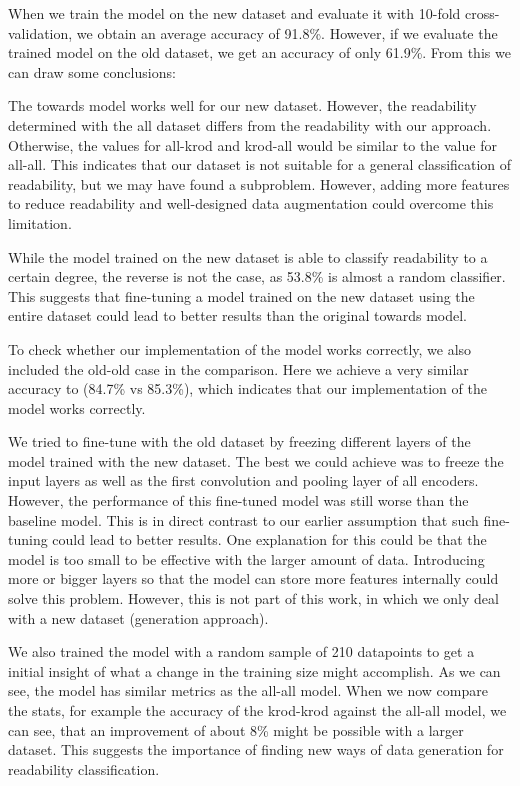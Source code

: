 \documentclass[%
class=scrreprt,
chapterprefix=false,%
open=right,%
twoside=false,%
paper=a4,%
logofile={Logo\_zentral\_farbig\_EN.png},%
thesistype=master,%
UKenglish,%
]{se2thesis}
\theoremstyle{definition}
\begin{document}
	When we train the model on the new dataset and evaluate it with 10-fold cross-validation, we obtain an average accuracy of 91.8\%. However, if we evaluate the trained model on the old dataset, we get an accuracy of only 61.9\%. From this we can draw some conclusions:
	
	The towards model works well for our new dataset. However, the readability determined with the all dataset differs from the readability with our approach. Otherwise, the values for all-krod and krod-all would be similar to the value for all-all. This indicates that our dataset is not suitable for a general classification of readability, but we may have found a subproblem. However, adding more features to reduce readability and well-designed data augmentation could overcome this limitation.
		
	While the model trained on the new dataset is able to classify readability to a certain degree, the reverse is not the case, as 53.8\% is almost a random classifier. This suggests that fine-tuning a model trained on the new dataset using the entire dataset could lead to better results than the original towards model.
	
	To check whether our implementation of the model works correctly, we also included the old-old case in the comparison. Here we achieve a very similar accuracy to \citeauthor{mi2022towards} (84.7\% vs 85.3\%), which indicates that our implementation of the model works correctly.
	
	We tried to fine-tune with the old dataset by freezing different layers of the model trained with the new dataset. The best we could achieve was to freeze the input layers as well as the first convolution and pooling layer of all encoders. However, the performance of this fine-tuned model was still worse than the baseline model. This is in direct contrast to our earlier assumption that such fine-tuning could lead to better results. One explanation for this could be that the model is too small to be effective with the larger amount of data. Introducing more or bigger layers so that the model can store more features internally could solve this problem. However, this is not part of this work, in which we only deal with a new dataset (generation approach).
	
	We also trained the model with a random sample of 210 datapoints to get a initial insight of what a change in the training size might accomplish. As we can see, the model has similar metrics as the all-all model. When we now compare the stats, for example the accuracy of the krod-krod against the all-all model, we can see, that an improvement of about 8\% might be possible with a larger dataset. This suggests the importance of finding new ways of data generation for readability classification.
	
\end{document}
